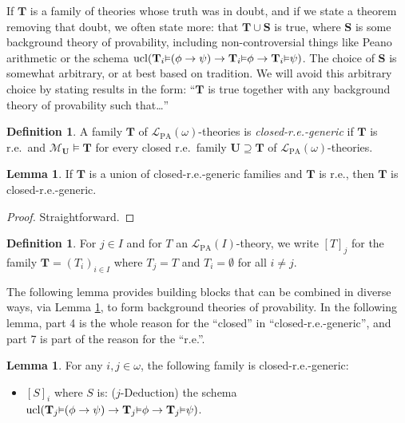 \documentclass[reqno]{article}
\theoremstyle{definition}
\newtheorem{lemma}[theorem]{Lemma}
\newtheorem{definition}[theorem]{Definition}
\def\L{\mathscr{L}}
\def\M{\mathscr{M}}
\def\T{\mathbf{T}}
\def\S{\mathbf{S}}
\def\U{\mathbf{U}}
\def\LPA{\L_{\mathrm{PA}}}
\renewcommand{\Pr}[1]{\T_{#1}\mbox{\small${\vDash}$}}
\newcommand{\ucl}[1]{\mathrm{ucl}(#1)}
\begin{document}
If $\T$ is a family of
theories whose truth was in doubt,
and if we state a theorem removing that doubt,
we often state more:
that $\T\cup\S$
is true,
where $\S$ is some
background theory of provability, including non-controversial things
like Peano arithmetic or the schema $\ucl{\Pr i(\phi\rightarrow\psi)\rightarrow\Pr i\phi\rightarrow\Pr i\psi}$.
The choice of $\S$ is somewhat arbitrary, or at best based on tradition.
We will avoid this arbitrary choice by stating results in the form:
``$\T$ is true together with any background theory of provability such that\ldots''


\begin{definition}
\label{closedregenericdefn}
A family $\T$ of $\LPA(\omega)$-theories is
\emph{closed-r.e.-generic}
if $\T$ is r.e.~and
$\M_{\U}\models\T$ for every closed r.e.~family $\U\supseteq\T$ of $\LPA(\omega)$-theories.
\end{definition}

\begin{lemma}
\label{genericclosedreunion}
If $\T$ is a union of closed-r.e.-generic families
and $\T$ is r.e., then $\T$ is closed-r.e.-generic.
\end{lemma}

\begin{proof}
Straightforward.
\end{proof}

\begin{definition}
For $j\in I$ and for $T$ an $\LPA(I)$-theory,
we write $[T]_j$ for the family $\T=(T_i)_{i\in I}$
where $T_j=T$ and $T_i=\emptyset$ for all $i\not=j$.
\end{definition}


The following lemma provides building blocks
that can be combined in diverse ways, via Lemma \ref{genericclosedreunion}, to
form background theories of provability.  In the following lemma, part 4 is the
whole reason for the ``closed'' in ``closed-r.e.-generic'', and part 7 is
part of the reason for the ``r.e.''.

\begin{lemma}
\label{firstutilbagdeduction}
For any $i,j\in\omega$, the following family is closed-r.e.-generic:
\begin{itemize}
    \item
    $[S]_i$ where $S$ is: ($j$-Deduction) the schema
    $\ucl{\Pr j(\phi\rightarrow\psi)\rightarrow \Pr j\phi\rightarrow\Pr j\psi}$.
\end{itemize}
\end{lemma}
\end{document}
